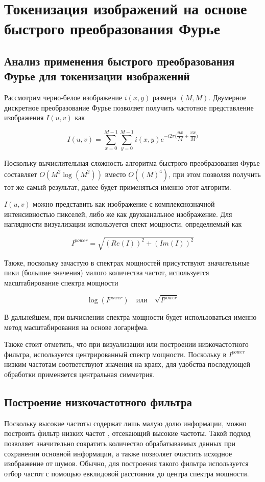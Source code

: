 \documentclass[times,specification,annotation]{itmo-student-thesis}
\begin{document}
\section{Токенизация изображений на основе быстрого преобразования Фурье}

\subsection{Анализ применения быстрого преобразования Фурье для токенизации изображений}

Рассмотрим черно-белое изображение $i(x, y)$ размера $(M, M)$. Двумерное дискретное преобразование Фурье \cite{gonzalez_woods} позволяет получить частотное представление изображения $I(u, v)$ как

$$
I(u, v) = \sum_{x=0}^{M-1}\sum_{y=0}^{M-1} i(x, y) e^{-i2\pi\Big(\dfrac{ux}{M} + \dfrac{vx}{M}\Big)}
$$

Поскольку вычислительная сложность алгоритма быстрого преобразования Фурье \cite{fft} составляет $O(M^2 \log(M^2))$ вместо $O((M)^4)$, при этом позволяя получить тот же самый результат, далее будет применяться именно этот алгоритм. 

$I(u, v)$ можно представить как изображение с комплекснозначной интенсивностью пикселей, либо же как двухканальное изображение. Для наглядности визуализации используется спект мощности, определяемый как 

$$
I^{power} = \sqrt{(Re(I))^2 + (Im(I))^2}
$$

Также, поскольку зачастую в спектрах мощностей присутствуют значительные пики (большие значения) малого количества частот, используется масштабирование спектра мощности

$$
\log(I^{power}) \quad \text{или} \quad \sqrt{I^{power}}
$$

В дальнейшем, при вычислении спектра мощности будет использоваться именно метод масштабирования на основе логарифма.

Также стоит отметить, что при визуализации или построении низкочастотного фильтра, используется центрированный спектр мощности. Поскольку в $I^{power}$ низким частотам соответствуют значения на краях, для удобства последующей обработки применяется центральная симметрия.

\subsection{Построение низкочастотного фильтра}

Поскольку высокие частоты содержат лишь малую долю информации, можно построить фильтр низких частот \cite{low_pass_filter}, отсекающий высокие частоты. Такой подход позволяет значительно сократить количество обрабатываемых данных при сохранении основной информации, а также позволяет очистить исходное изображение от шумов. Обычно, для построения такого фильтра используется отбор частот с помощью евклидовой расстояния до центра спектра мощности.
\end{document}

